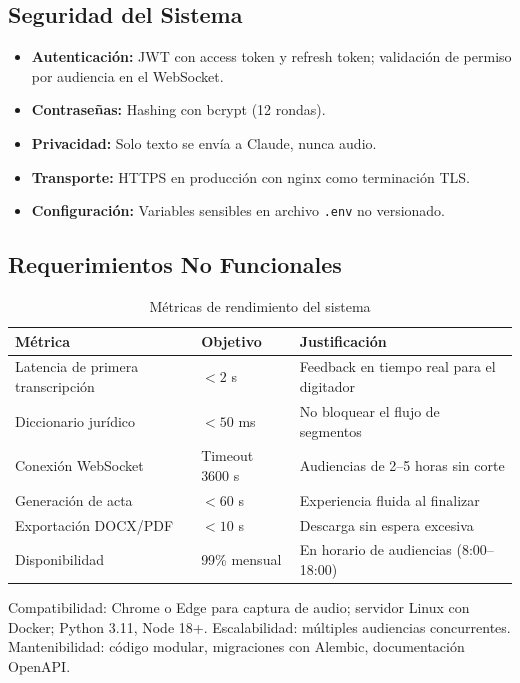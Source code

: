 \documentclass[12pt,a4paper,oneside]{report}
\begin{document}
\subsection{Seguridad del Sistema}

\begin{itemize}
\item \textbf{Autenticación:} JWT con access token y refresh token; validación de permiso por audiencia en el WebSocket.
\item \textbf{Contraseñas:} Hashing con bcrypt (12 rondas).
\item \textbf{Privacidad:} Solo texto se envía a Claude, nunca audio.
\item \textbf{Transporte:} HTTPS en producción con nginx como terminación TLS.
\item \textbf{Configuración:} Variables sensibles en archivo \texttt{.env} no versionado.
\end{itemize}

\subsection{Requerimientos No Funcionales}

\begin{table}[H]
\centering
\small
\caption{Métricas de rendimiento del sistema}
\begin{tabular}{|p{5cm}|p{3cm}|p{5cm}|}
\hline
\rowcolor{gray!20}
\textbf{Métrica} & \textbf{Objetivo} & \textbf{Justificación} \\
\hline
Latencia de primera transcripción & $< 2$ s & Feedback en tiempo real para el digitador \\
\hline
Diccionario jurídico & $< 50$ ms & No bloquear el flujo de segmentos \\
\hline
Conexión WebSocket & Timeout 3600 s & Audiencias de 2--5 horas sin corte \\
\hline
Generación de acta & $< 60$ s & Experiencia fluida al finalizar \\
\hline
Exportación DOCX/PDF & $< 10$ s & Descarga sin espera excesiva \\
\hline
Disponibilidad & 99\% mensual & En horario de audiencias (8:00--18:00) \\
\hline
\end{tabular}
\label{tab:rendimiento}
\end{table}

Compatibilidad: Chrome o Edge para captura de audio; servidor Linux con Docker; Python 3.11, Node 18+. Escalabilidad: múltiples audiencias concurrentes. Mantenibilidad: código modular, migraciones con Alembic, documentación OpenAPI.
\end{document}
